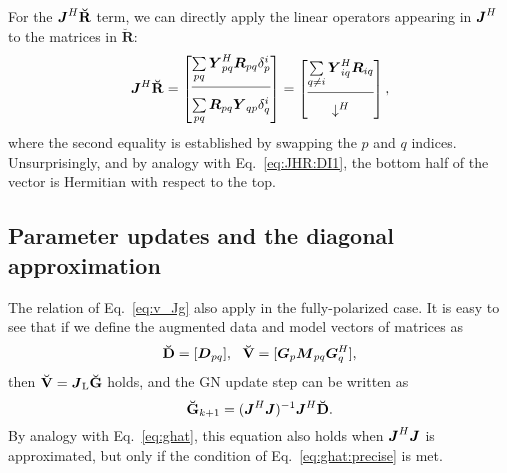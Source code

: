 \documentclass[useAMS,usenatbib]{mn2e}
\makeatletter
\newcommand{\mat}[1]{{\bmath{#1}}}
\newcommand{\JJ}{\mat{J}} %
\newcommand{\DD}{\mat{D}}
\newcommand{\MM}{\mat{M}}
\newcommand{\RR}{\mat{R}}
\newcommand{\GG}{\mat{G}}
\newcommand{\JHJ}{\JJ^H\JJ} %
\newcommand{\Matrix}[2]{\left [ \begin{array}{@{}#1@{}}#2\end{array} \right ]}
\newcommand{\Stack}[1]{\begin{array}{@{}c@{}}#1\end{array}}
\newcommand{\AUGx}[1]{\mathbf{\breve{#1}}}
\newcommand{\GGg}{\AUGx{G}}
\newcommand{\RRr}{\AUGx{R}}
\newcommand{\DDd}{\AUGx{D}}
\newcommand{\VVv}{\AUGx{V}}
\newcommand{\LEFT}{\mathrm{L}}
\numberwithin{equation}{section}
\makeatother
\begin{document}
For the $\JJ^H\RRr$ term, we can directly apply the linear operators appearing in $\JJ^H$ 
to the matrices in $\RRr$:
\begin{equation}
\JJ^H\RRr = \Matrix{c}{ 
\sum\limits_{pq} \YY^H_{pq} \RR_{pq} \delta^{i}_p  \\
\hline\\[-8pt]
\sum\limits_{pq} \RR_{pq} \YY_{qp} \delta^{i}_q 
} = \Matrix{c}{
\sum\limits_{q\ne i} \YY^H_{iq} \RR_{iq} \\
\hline\\[-8pt]
\downarrow^H
},
\end{equation}
where the second equality is established by swapping the $p$ and $q$ indices. Unsurprisingly, and by analogy with 
Eq.~\ref{eq:JHR:DI1}, the bottom half of the vector is Hermitian with respect to the top.

\subsection{Parameter updates and the diagonal approximation}

The relation of Eq.~\ref{eq:v_Jg} also apply in the fully-polarized case. It is easy to see that if we define the augmented 
data and model vectors of matrices as
\begin{equation}
\DDd = [ \DD_{pq} ],~~\VVv = [ \GG_p \MM_{pq} \GG_q^H ],
\end{equation}
then $\VVv = \JJ_\LEFT \GGg$ holds, and the GN update step can be written as
\begin{equation}
\label{eq:ghat:matrix}
\GGg_{k+1} = (\JHJ)^{-1} \JJ^H \DDd.
\end{equation}
By analogy with Eq.~\ref{eq:ghat}, this equation also holds when $\JHJ$ is approximated, but only if the condition of 
Eq.~\ref{eq:ghat:precise} is met.
\end{document}
